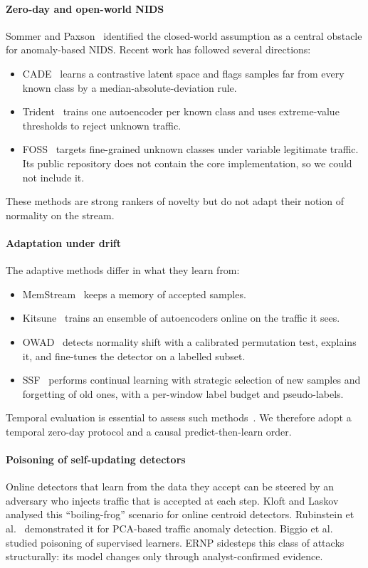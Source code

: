 \documentclass[preprint,12pt]{elsarticle}
\begin{document}
\paragraph{Zero-day and open-world NIDS}
Sommer and Paxson~\cite{sommer2010outside} identified the closed-world assumption as a central obstacle for anomaly-based NIDS. Recent work has followed several directions:
\begin{itemize}
\item CADE~\cite{yang2021cade} learns a contrastive latent space and flags samples far from every known class by a median-absolute-deviation rule.
\item Trident~\cite{zhao2024trident} trains one autoencoder per known class and uses extreme-value thresholds to reject unknown traffic.
\item FOSS~\cite{zhao2024foss} targets fine-grained unknown classes under variable legitimate traffic. Its public repository does not contain the core implementation, so we could not include it.
\end{itemize}
These methods are strong rankers of novelty but do not adapt their notion of normality on the stream.

\paragraph{Adaptation under drift}
The adaptive methods differ in what they learn from:
\begin{itemize}
\item MemStream~\cite{bhatia2022memstream} keeps a memory of accepted samples.
\item Kitsune~\cite{mirsky2018kitsune} trains an ensemble of autoencoders online on the traffic it sees.
\item OWAD~\cite{han2023owad} detects normality shift with a calibrated permutation test, explains it, and fine-tunes the detector on a labelled subset.
\item SSF~\cite{zhang2025ssf} performs continual learning with strategic selection of new samples and forgetting of old ones, with a per-window label budget and pseudo-labels.
\end{itemize}
Temporal evaluation is essential to assess such methods~\cite{pendlebury2019tesseract,arp2022dos}. We therefore adopt a temporal zero-day protocol and a causal predict-then-learn order.

\paragraph{Poisoning of self-updating detectors}
Online detectors that learn from the data they accept can be steered by an adversary who injects traffic that is accepted at each step. Kloft and Laskov~\cite{kloft2012security} analysed this ``boiling-frog'' scenario for online centroid detectors. Rubinstein et al.~\cite{rubinstein2009antidote} demonstrated it for PCA-based traffic anomaly detection. Biggio et al.~\cite{biggio2012poisoning} studied poisoning of supervised learners. ERNP sidesteps this class of attacks structurally: its model changes only through analyst-confirmed evidence.
\end{document}
